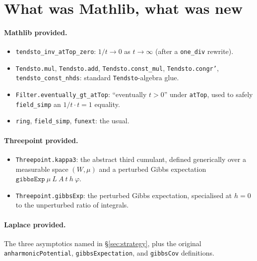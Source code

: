 \documentclass[11pt]{article}
\begin{document}
\section{What was Mathlib, what was new}

\paragraph{Mathlib provided.}
\begin{itemize}
\item \texttt{tendsto\_inv\_atTop\_zero}: $1/t \to 0$ as $t \to \infty$
(after a \texttt{one\_div} rewrite).
\item \texttt{Tendsto.mul}, \texttt{Tendsto.add}, \texttt{Tendsto.const\_mul},
\texttt{Tendsto.congr'}, \texttt{tendsto\_const\_nhds}: standard
\texttt{Tendsto}-algebra glue.
\item \texttt{Filter.eventually\_gt\_atTop}: ``eventually $t > 0$''
under \texttt{atTop}, used to safely \texttt{field\_simp} an
$1/t \cdot t = 1$ equality.
\item \texttt{ring}, \texttt{field\_simp}, \texttt{funext}: the usual.
\end{itemize}

\paragraph{Threepoint provided.}
\begin{itemize}
\item \texttt{Threepoint.kappa3}: the abstract third cumulant, defined
generically over a measurable space $(W, \mu)$ and a perturbed Gibbs
expectation $\mathtt{gibbsExp}~\mu~L~A~t~h~\varphi$.
\item \texttt{Threepoint.gibbsExp}: the perturbed Gibbs expectation,
specialised at $h = 0$ to the unperturbed ratio of integrals.
\end{itemize}

\paragraph{Laplace provided.}
The three asymptotics named in \S\ref{sec:strategy}, plus the original
\texttt{anharmonicPotential}, \texttt{gibbsExpectation}, and
\texttt{gibbsCov} definitions.
\end{document}
